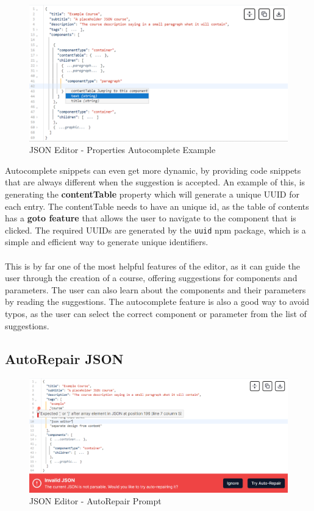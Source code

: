 \begin{figure}[hbt!]
    \centering
    \includegraphics[scale=0.65]{images/json-editor-autocomplete-fields.png}
    \caption{JSON Editor - Properties Autocomplete Example}
    \label{fig:json-editor-autocomplete-fields}
\end{figure}

\noindent Autocomplete snippets can even get more dynamic, by providing code snippets that are always different when the suggestion is accepted. An example of this, is generating the \textbf{contentTable} property which will generate a unique UUID for each entry. The contentTable needs to have an unique id, as the table of contents has a \textbf{goto feature} that allows the user to navigate to the component that is clicked. The required UUIDs are generated by the \texttt{uuid} npm package, which is a simple and efficient way to generate unique identifiers.
\\\\
\noindent This is by far one of the most helpful features of the editor, as it can guide the user through the creation of a course, offering suggestions for components and parameters. The user can also learn about the components and their parameters by reading the suggestions. The autocomplete feature is also a good way to avoid typos, as the user can select the correct component or parameter from the list of suggestions.

\subsection{AutoRepair JSON}

\begin{figure}[h]
    \centering
    \includegraphics[scale=0.55]{images/json-editor-autorepair.png}
    \caption{JSON Editor - AutoRepair Prompt}
    \label{fig:json-editor-autorepair}
\end{figure}

